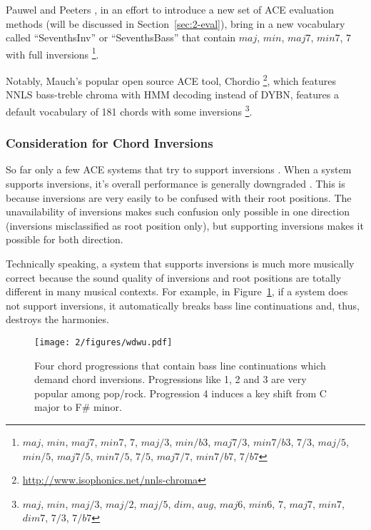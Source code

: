 Pauwel and Peeters \cite{pauwels2013evaluating}, in an effort to introduce a new set of ACE evaluation methods (will be discussed in Section~\ref{sec:2-eval}), bring in a new vocabulary called ``SeventhsInv'' or ``SeventhsBass'' that contain $maj$, $min$, $maj7$, $min7$, $7$ with full inversions \footnote{$maj$, $min$, $maj7$, $min7$, $7$, $maj/3$, $min/b3$, $maj7/3$, $min7/b3$, $7/3$, $maj/5$, $min/5$, $maj7/5$, $min7/5$, $7/5$, $maj7/7$, $min7/b7$, $7/b7$}.

Notably, Mauch's popular open source ACE tool, Chordio \cite{cannam2010sonic}\footnote{\url{http://www.isophonics.net/nnls-chroma}}, which features NNLS bass-treble chroma with HMM decoding instead of DYBN, features a default vocabulary of 181 chords with some inversions \footnote{$maj$, $min$, $maj/3$, $maj/2$, $maj/5$, $dim$, $aug$, $maj6$, $min6$, $7$, $maj7$, $min7$, $dim7$, $7/3$, $7/b7$}.


\subsubsection{Consideration for Chord Inversions}
So far only a few ACE systems that try to support inversions \cite{cannam2010sonic,mauch2010automatic,ni2012end,mcvicar2013machine,deng2016chord,deng2016hybrid}. When a system supports inversions, it's overall performance is generally downgraded \cite{deng2016chord}. This is because inversions are very easily to be confused with their root positions. The unavailability of inversions makes such confusion only possible in one direction (inversions misclassified as root position only), but supporting inversions makes it possible for both direction.

Technically speaking, a system that supports inversions is much more musically correct because the sound quality of inversions and root positions are totally different in many musical contexts. For example, in Figure~\ref{fig:2-wdwu}, if a system does not support inversions, it automatically breaks bass line continuations and, thus, destroys the harmonies.
\begin{figure}[htb]
\centering
\texttt{[image: 2/figures/wdwu.pdf]}
\caption{Four chord progressions that contain bass line continuations which demand chord inversions. Progressions like 1, 2 and 3 are very popular among pop/rock. Progression 4 induces a key shift from C major to F\# minor.}
\label{fig:2-wdwu}
\end{figure}

